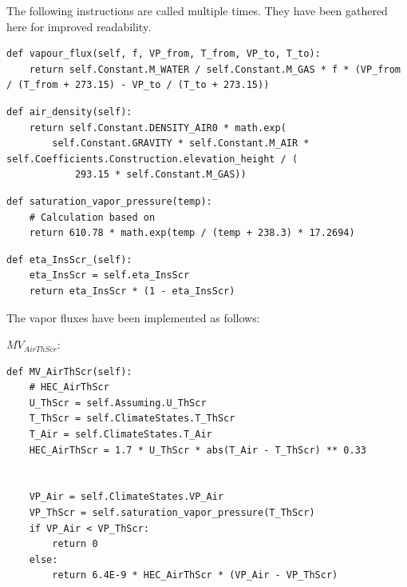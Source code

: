 \documentclass[a4paper]{article}
\numberwithin{equation}{section}
\begin{document}
The following instructions are called multiple times.
They have been gathered here for improved readability.
\begin{mdframed}[leftline=false,rightline=false,backgroundcolor=magenta!10,nobreak=true]
  \begin{verbatim}
def vapour_flux(self, f, VP_from, T_from, VP_to, T_to):
    return self.Constant.M_WATER / self.Constant.M_GAS * f * (VP_from / (T_from + 273.15) - VP_to / (T_to + 273.15))
  \end{verbatim}
\end{mdframed}
\begin{mdframed}[leftline=false,rightline=false,backgroundcolor=magenta!10,nobreak=true]
  \begin{verbatim}
def air_density(self):
    return self.Constant.DENSITY_AIR0 * math.exp(
        self.Constant.GRAVITY * self.Constant.M_AIR * self.Coefficients.Construction.elevation_height / (
            293.15 * self.Constant.M_GAS))
  \end{verbatim}
\end{mdframed}
\begin{mdframed}[leftline=false,rightline=false,backgroundcolor=magenta!10,nobreak=true]
  \begin{verbatim}
def saturation_vapor_pressure(temp):
    # Calculation based on
    return 610.78 * math.exp(temp / (temp + 238.3) * 17.2694)
  \end{verbatim}
\end{mdframed}
\begin{mdframed}[leftline=false,rightline=false,backgroundcolor=magenta!10,nobreak=true]
  \begin{verbatim}
def eta_InsScr_(self):
    eta_InsScr = self.eta_InsScr
    return eta_InsScr * (1 - eta_InsScr)
  \end{verbatim}
\end{mdframed}


The vapor fluxes have been implemented as follows:

\( MV_{AirThScr} \):
\begin{mdframed}[leftline=false,rightline=false,backgroundcolor=magenta!10,nobreak=true]
  \begin{verbatim}
def MV_AirThScr(self):
    # HEC_AirThScr
    U_ThScr = self.Assuming.U_ThScr
    T_ThScr = self.ClimateStates.T_ThScr
    T_Air = self.ClimateStates.T_Air
    HEC_AirThScr = 1.7 * U_ThScr * abs(T_Air - T_ThScr) ** 0.33


    VP_Air = self.ClimateStates.VP_Air
    VP_ThScr = self.saturation_vapor_pressure(T_ThScr)
    if VP_Air < VP_ThScr:
        return 0
    else:
        return 6.4E-9 * HEC_AirThScr * (VP_Air - VP_ThScr)
  \end{verbatim}
\end{mdframed}
\end{document}
